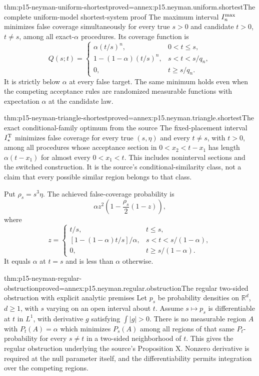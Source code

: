 \begin{hbtheorem}{thm:p15-neyman-uniform-shortest}{proved=annex:p15.neyman.uniform.shortest}{The complete uniform-model shortest-system proof}
The maximum interval \(I_n^{\rm max}\) minimizes false coverage
simultaneously for every true \(s>0\) and candidate \(t>0\), \(t\ne s\),
among all exact-\(\alpha\) procedures. Its coverage function is
\[
 Q(s;t)=
 \begin{cases}
 \alpha(t/s)^n,&0<t\leq s,\\
 1-(1-\alpha)(t/s)^n,&s<t<s/q_n,\\
 0,&t\geq s/q_n.
 \end{cases}
\]
It is strictly below \(\alpha\) at every false target.
The same minimum holds even when the competing acceptance
rules are randomized measurable functions with expectation
\(\alpha\) at the candidate law.
\end{hbtheorem}

\begin{hbtheorem}{thm:p15-neyman-triangle-shortest}{proved=annex:p15.neyman.triangle.shortest}{The exact conditional-family optimum from the source}
The fixed-placement interval \(I_*^{\rm T}\) minimizes false
coverage for every true \((s,\eta)\) and every \(t\ne s\),
with \(t>0\),
among all procedures whose acceptance section in
\(0<x_2<t-x_1\) has length \(\alpha(t-x_1)\) for almost every
\(0<x_1<t\).
This includes noninterval sections and the switched construction.
It is the source's conditional-similarity class, not a claim that
every possible similar region belongs to that class.

Put \(\rho_s=s^3\eta\). The achieved false-coverage probability is
\[
             \alpha z^2\left(1-\frac{\rho_s}{2}(1-z)\right),
\]
where
\[
 z=\begin{cases}
 t/s,&t\leq s,\\
 [1-(1-\alpha)t/s]/\alpha,&s<t<s/(1-\alpha),\\
 0,&t\geq s/(1-\alpha).
 \end{cases}
\]
It equals \(\alpha\) at \(t=s\) and is less than \(\alpha\)
otherwise.
\end{hbtheorem}

\begin{hbtheorem}{thm:p15-neyman-regular-obstruction}{proved=annex:p15.neyman.regular.obstruction}{The regular two-sided obstruction with explicit analytic premises}
Let \(p_s\) be probability densities on \(\mathbb R^d\),
\(d\geq1\), with \(s\) varying on an open interval about \(t\).
Assume \(s\mapsto p_s\) is differentiable at \(t\) in \(L^1\),
with derivative \(g\) satisfying \(\int|g|>0\).
There is no measurable region \(A\) with \(P_t(A)=\alpha\)
which minimizes \(P_s(A)\) among all regions of that same
\(P_t\)-probability for every \(s\ne t\) in a two-sided
neighborhood of \(t\).
This gives the regular obstruction underlying the source's
Proposition X. Nonzero derivative is required at the null
parameter itself, and the differentiability permits integration
over the competing regions.
\end{hbtheorem}

